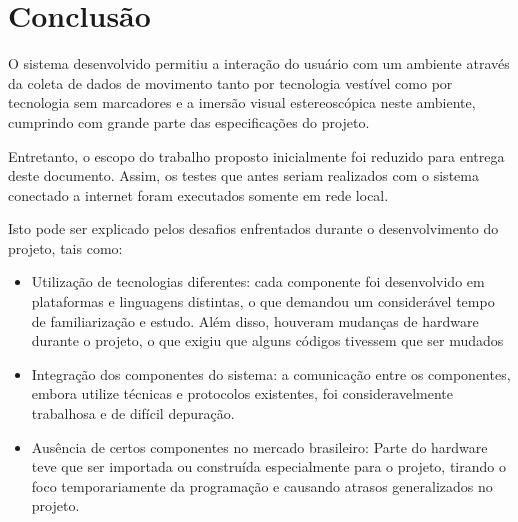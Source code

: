 	\chapter{Conclusão}\label{cap-conclusao}
	
	O sistema desenvolvido permitiu a interação do usuário com um ambiente através da coleta de dados de movimento tanto por tecnologia vestível como por tecnologia sem marcadores e a imersão visual estereoscópica neste ambiente, cumprindo com grande parte das especificações do projeto.\par

	Entretanto, o escopo do trabalho proposto inicialmente foi reduzido para entrega
	deste documento. Assim, os testes que antes seriam realizados com o sistema conectado a internet foram executados somente em rede local. \par
	
	Isto pode ser explicado pelos desafios enfrentados durante o desenvolvimento do
	projeto, tais como:
		\begin{itemize}
	 \item Utilização de tecnologias diferentes: cada componente foi desenvolvido em plataformas e linguagens distintas, o que demandou um considerável tempo de familiarização e estudo. Além disso, houveram mudanças de hardware durante o projeto, o que exigiu que alguns códigos tivessem que ser mudados
	 
	 \item Integração dos componentes do sistema: a comunicação entre os componentes, embora utilize técnicas e protocolos existentes, foi consideravelmente trabalhosa e de difícil depuração.
	
	
	\item Ausência de certos componentes no mercado brasileiro: Parte do hardware teve que ser importada ou construída especialmente para o projeto, tirando o foco temporariamente da programação e causando atrasos generalizados no projeto.
	\end{itemize}
	
